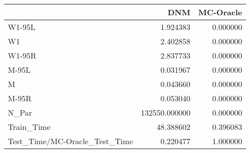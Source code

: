 \begin{tabular}{lrr}
\toprule
{} &            DNM &  MC-Oracle \\
\midrule
W1-95L                        &       1.924383 &   0.000000 \\
W1                            &       2.402858 &   0.000000 \\
W1-95R                        &       2.837733 &   0.000000 \\
M-95L                         &       0.031967 &   0.000000 \\
M                             &       0.043660 &   0.000000 \\
M-95R                         &       0.053040 &   0.000000 \\
N\_Par                         &  132550.000000 &   0.000000 \\
Train\_Time                    &      48.388602 &   0.396083 \\
Test\_Time/MC-Oracle\_Test\_Time &       0.220477 &   1.000000 \\
\bottomrule
\end{tabular}

